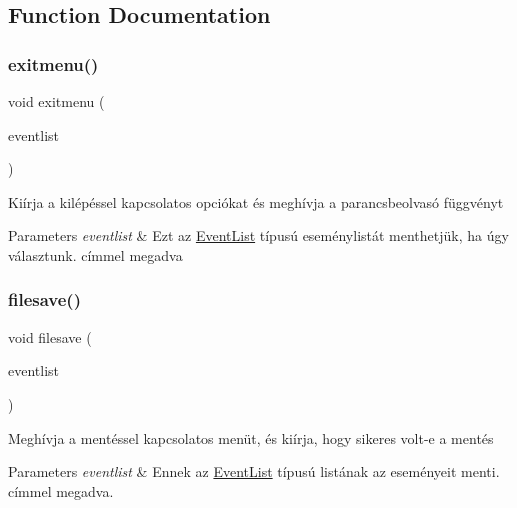 \subsection{Function Documentation}
\mbox{\label{group__menu_gac651d3838f4da7bf6055fa839621e289}} 
\subsubsection{\texorpdfstring{exitmenu()}{exitmenu()}}
{\footnotesize\ttfamily void exitmenu (\begin{DoxyParamCaption}\item[{\hyperlink{struct_event_list}{Event\+List} $\ast$}]{eventlist }\end{DoxyParamCaption})}

Kiírja a kilépéssel kapcsolatos opciókat és meghívja a parancsbeolvasó függvényt 
\begin{DoxyParams}{Parameters}
{\em eventlist} & Ezt az \hyperlink{struct_event_list}{Event\+List} típusú eseménylistát menthetjük, ha úgy választunk. címmel megadva \\
\hline
\end{DoxyParams}
\mbox{\label{group__menu_ga6ee903116c3ec27e1a4680b08e6647e2}} 
\subsubsection{\texorpdfstring{filesave()}{filesave()}}
{\footnotesize\ttfamily void filesave (\begin{DoxyParamCaption}\item[{\hyperlink{struct_event_list}{Event\+List} const $\ast$}]{eventlist }\end{DoxyParamCaption})}

Meghívja a mentéssel kapcsolatos menüt, és kiírja, hogy sikeres volt-\/e a mentés 
\begin{DoxyParams}{Parameters}
{\em eventlist} & Ennek az \hyperlink{struct_event_list}{Event\+List} típusú listának az eseményeit menti. címmel megadva. \\
\hline
\end{DoxyParams}
\mbox{\label{group__menu_gab9ac014b764791c1dc71c187dca898f7}} 
